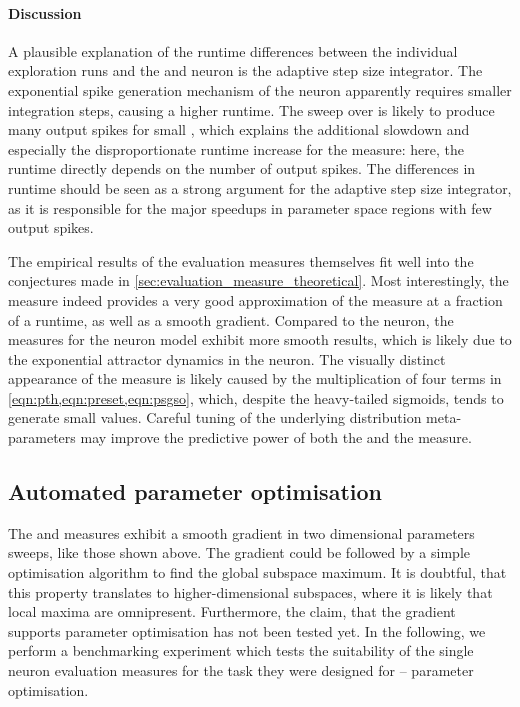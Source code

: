 \paragraph{Discussion}
A plausible explanation of the runtime differences between the individual exploration runs and the \AdEx and \LIF neuron is the adaptive step size integrator. The exponential spike generation mechanism of the \AdEx neuron apparently requires smaller integration steps, causing a higher runtime. The sweep over \ETh is likely to produce many output spikes for small \ETh, which explains the additional slowdown and especially the disproportionate runtime increase for the \SGMO measure: here, the runtime directly depends on the number of output spikes. The differences in runtime should be seen as a strong argument for the adaptive step size integrator, as it is responsible for the major speedups in parameter space regions with few output spikes.

The empirical results of the evaluation measures themselves fit well into the conjectures made in \cref{sec:evaluation_measure_theoretical}. Most interestingly, the \SGMO measure indeed provides a very good approximation of the \STII measure at a fraction of a runtime, as well as a smooth gradient. Compared to the \AdEx neuron, the measures for the \LIF neuron model exhibit more smooth results, which is likely due to the exponential attractor dynamics in the \AdEx neuron. The visually distinct appearance of the \SGSO measure is likely caused by the multiplication of four terms in \cref{eqn:pth,eqn:preset,eqn:psgso}, which, despite the heavy-tailed sigmoids, tends to generate small values. Careful tuning of the underlying distribution meta-parameters may improve the predictive power of both the \SGSO and the \SGMO measure.

\subsection{Automated parameter optimisation}
\label{sec:optimisation}

The \SGMO and \SGSO measures exhibit a smooth gradient in two dimensional parameters sweeps, like those shown above. The gradient could be followed by a simple optimisation algorithm to find the global subspace maximum. It is doubtful, that this property translates to higher-dimensional subspaces, where it is likely that local maxima are omnipresent. Furthermore, the claim, that the gradient supports parameter optimisation has not been tested yet. In the following, we perform a benchmarking experiment which tests the suitability of the single neuron evaluation measures for the task they were designed for -- parameter optimisation.

